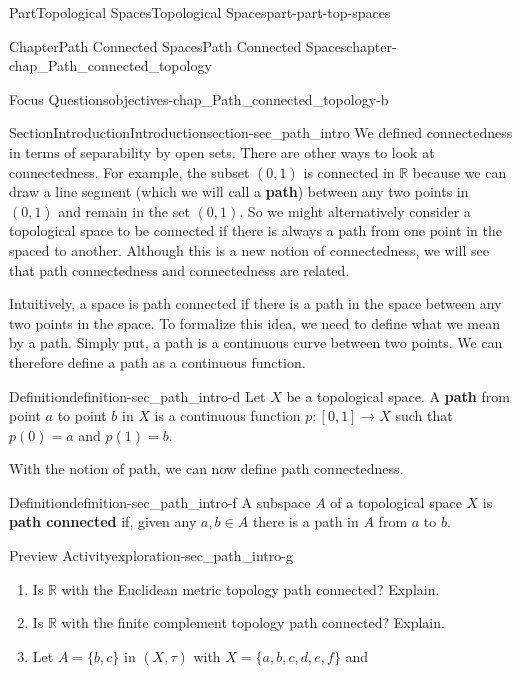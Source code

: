 \documentclass[oneside,10pt,]{book}
\newcommand{\terminology}[1]{\textbf{#1}}
\numberwithin{equation}{chapter}
\newcommand{\R}{\mathbb{R}}
\begin{document}
\begin{partptx}{Part}{Topological Spaces}{}{Topological Spaces}{}{}{part-part-top-spaces}
\begin{chapterptx}{Chapter}{Path Connected Spaces}{}{Path Connected Spaces}{}{}{chapter-chap_Path_connected_topology}
\begin{objectives}{Focus Questions}{objectives-chap_Path_connected_topology-b}
\begin{itemize}[label=\textbullet]
\end{itemize}
\end{objectives}
%
%
\typeout{************************************************}
\typeout{************************************************}
%
\begin{sectionptx}{Section}{Introduction}{}{Introduction}{}{}{section-sec_path_intro}
We defined connectedness in terms of separability by open sets. There are other ways to look at connectedness. For example, the subset \((0,1)\) is connected in \(\R\) because we can draw a line segment (which we will call a \terminology{path}) between any two points in \((0,1)\) and remain in the set \((0,1)\). So we might alternatively consider a topological space to be connected if there is always a path from one point in the spaced to another. Although this is a new notion of connectedness, we will see that path connectedness and connectedness are related.%
\par
Intuitively, a space is path connected if there is a path in the space between any two points in the space. To formalize this idea, we need to define what we mean by a path. Simply put, a path is a continuous curve between two points. We can therefore define a path as a continuous function.%
\begin{definition}{Definition}{}{definition-sec_path_intro-d}%
%
Let \(X\) be a topological space. A \terminology{path} from point \(a\) to point \(b\) in \(X\) is a continuous function \(p: [0,1] \to X\) such that \(p(0) = a\) and \(p(1)=b\).%
\end{definition}
With the notion of path, we can now define path connectedness.%
\begin{definition}{Definition}{}{definition-sec_path_intro-f}%
%
A subspace \(A\) of a topological space \(X\) is \terminology{path connected} if, given any \(a, b \in A\) there is a path in \(A\) from \(a\) to \(b\).%
\end{definition}
\begin{exploration}{Preview Activity}{}{exploration-sec_path_intro-g}%
\begin{enumerate}[font=\bfseries,label=(\alph*),ref=\alph*]%
\item{}Is \(\R\) with the Euclidean metric topology path connected? Explain.%
\item{}Is \(\R\) with the finite complement topology path connected? Explain.%
\item{}Let \(A = \{b,c\}\) in \((X, \tau)\) with \(X= \{a,b,c,d,e,f\}\) and%

\end{enumerate}
\end{exploration}
\end{sectionptx}
\end{chapterptx}
\end{partptx}
\end{document}
